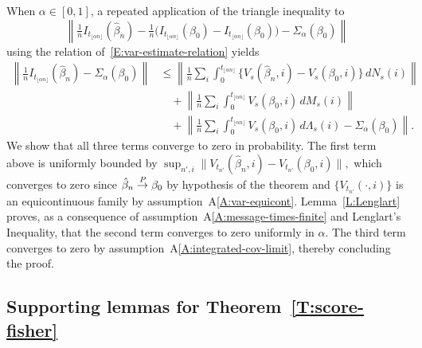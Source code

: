 \documentclass[final]{statsoc}
\begin{document}
When $\alpha \in [0, 1]$, a repeated application of the triangle
inequality to
\[
    \left\|
        \tfrac{1}{n} I_{t_{\lfloor \alpha n \rfloor}}(\hat \beta_n)
        -
        \tfrac{1}{n} \big(
            I_{t_{\lfloor \alpha n \rfloor}}(\beta_0)
            -
            I_{t_{\lfloor \alpha n \rfloor}}(\beta_0)
        \big)
        -
        \Sigma_{\alpha} (\beta_0)
    \right\|
\]
using the relation of~\eqref{E:var-estimate-relation} yields
\begin{align*}
    \left\|
        \tfrac{1}{n} I_{t_{\lfloor \alpha n \rfloor}}(\hat \beta_n)
        -
        \Sigma_{\alpha} (\beta_0)
    \right\|
        &\leq
        \left\|
            \frac{1}{n}
            \sum_i
            \int_0^{t_{\lfloor \alpha n \rfloor}}
                \{
                    V_s(\hat \beta_n, i)
                    -
                    V_s(\beta_0, i)
                \} \, dN_s(i)
        \right\| \\
        &\quad+
        \left\|
            \frac{1}{n}
            \sum_i
            \int_0^{t_{\lfloor \alpha n \rfloor}}
                V_s(\beta_0, i) \, dM_s(i)
        \right\| \\
        &\quad+
        \left\|
            \frac{1}{n}
            \sum_i
            \int_0^{t_{\lfloor \alpha n \rfloor}}
                V_s(\beta_0,i)
                \, d\Lambda_s(i)
            -
            \Sigma_{\alpha}(\beta_0)
        \right\|.
\end{align*}
We show that all three terms converge to zero in probability.
The first term above is uniformly bounded by
\(
    \sup_{n',i}
        \|
            V_{t_{n'}}(\hat \beta_n, i)
            -
            V_{t_{n'}}(\beta_0, i)
        \|,
\)
which converges to zero since $\hat \beta_n \overset{\mathit{P}}{\to} \beta_0$ by
hypothesis of the theorem and $\{ V_{t_{n'}}(\cdot, i) \}$ is an
equicontinuous family by assumption~A\ref{A:var-equicont}.
Lemma~\ref{L:Lenglart} proves, as a consequence of
assumption~A\ref{A:message-times-finite} and Lenglart's \citeyearpar{lenglart1977relation}
Inequality, that the second term converges
to zero uniformly in $\alpha$.
The third term converges to zero by
assumption~A\ref{A:integrated-cov-limit}, thereby concluding the proof.


\subsection{Supporting lemmas for Theorem~\ref{T:score-fisher}}
\end{document}
